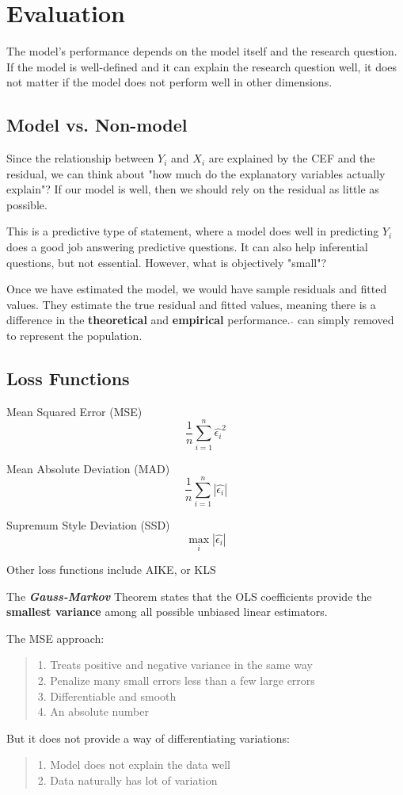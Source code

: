 \section{Evaluation}
The model's performance depends on the model itself and the research question. If the model is well-defined and it can explain the research question well, it does not matter if the model does not perform well in other dimensions.

\subsection{Model vs. Non-model}
Since the relationship between $Y_i$ and $X_i$ are explained by the CEF and the residual, we can think about "how much do the explanatory variables actually explain"? If our model is well, then we should rely on the residual as little as possible.

This is a predictive type of statement, where a model does well in predicting $Y_i$ does a good job answering predictive questions. It can also help inferential questions, but not essential. However, what is objectively "small"?

Once we have estimated the model, we would have sample residuals and fitted values. They estimate the true residual and fitted values, meaning there is a difference in the \textbf{theoretical} and \textbf{empirical} performance. $\hat{}$ can simply removed to represent the population.

\subsection{Loss Functions}
Mean Squared Error (MSE)
$$\frac{1}{n} \sum_{i=1}^{n} \hat{\epsilon_i}^2$$

Mean Absolute Deviation (MAD)
$$\frac{1}{n} \sum_{i=1}^{n} |\hat{\epsilon_i}|$$

Supremum Style Deviation (SSD)
$$\max_i |\hat{\epsilon_i}|$$

Other loss functions include AIKE, or KLS

\begin{theorem}
    The \textbf{\textit{Gauss-Markov}} Theorem states that the OLS coefficients provide the \textbf{smallest variance} among all possible unbiased linear estimators.
\end{theorem}

The MSE approach:
\begin{quote}
    1. Treats positive and negative variance in the same way \\
    2. Penalize many small errors less than a few large errors \\
    3. Differentiable and smooth \\
    4. An absolute number
\end{quote}
But it does not provide a way of differentiating variations:
\begin{quote}
    1. Model does not explain the data well \\
    2. Data naturally has lot of variation
\end{quote}


